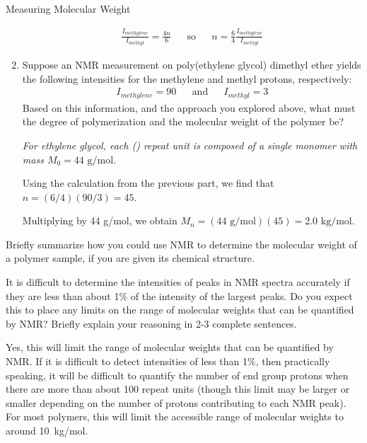 \begin{activity}{Measuring Molecular Weight}
\begin{ctqs}
\begin{enumerate}
				\begin{solution}[1.25in]
					\begin{align*}
						\frac{I_{methylene}}{I_{methyl}} = \frac{4n}{6} && \text{so} && n = \frac{6}{4}\frac{I_{methylene}}{I_{methyl}}
					\end{align*}
				\end{solution}
				
			\item Suppose an NMR measurement on poly(ethylene glycol) dimethyl ether yields the following intensities for the methylene and methyl protons, respectively:
				\begin{align*}
					I_{methylene}=90 && \text{and} &&
					I_{methyl}=3
				\end{align*}
				Based on this information, and the approach you explored above, what must the degree of polymerization and the molecular weight of the polymer be?
				
				\emph{For ethylene glycol, each () repeat unit is composed of a single monomer with mass $M_0=44\text{ g/mol}$.}
				
				\begin{solution}[1.5in]
					Using the calculation from the previous part, we find that $n = (6/4)(90/3) = 45$.
					
					Multiplying by 44 g/mol, we obtain $M_n = (44\text{ g/mol})(45) = 2.0\text{ kg/mol}$.
				\end{solution}
				
		\end{enumerate}
		
		\question Briefly summarize how you could use NMR to determine the molecular weight of a polymer sample, if you are given its chemical structure.
		
			\begin{solution}[2in]
			\end{solution}
		
		\question It is difficult to determine the intensities of peaks in NMR spectra accurately if they are less than about 1\% of the intensity of the largest peaks.  Do you expect this to place any limits on the range of molecular weights that can be quantified by NMR?  Briefly explain your reasoning in 2-3 complete sentences.
		
			\begin{solution}[2in]
				Yes, this will limit the range of molecular weights that can be quantified by NMR.  If it is difficult to detect intensities of less than 1\%, then practically speaking, it will be difficult to quantify the number of end group protons when there are more than about 100 repeat units (though this limit may be larger or smaller depending on the number of protons contributing to each NMR peak).  For most polymers, this will limit the accessible range of molecular weights to around 10~kg/mol.
			\end{solution}
	

\end{ctqs}
\end{activity}
